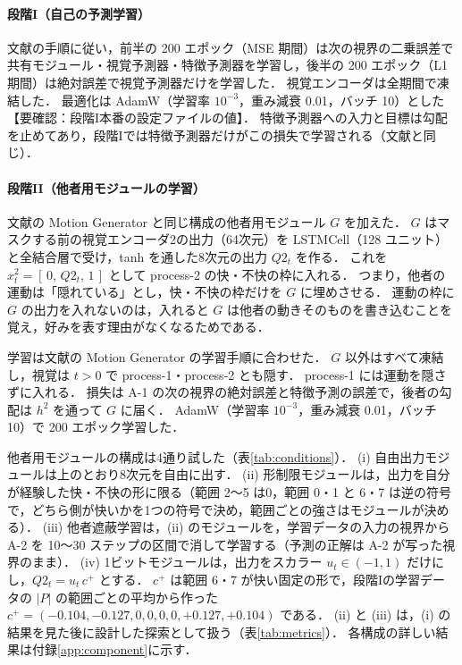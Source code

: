 \paragraph{段階I（自己の予測学習）}
文献\cite{noguchi2022superposition}の手順に従い，前半の 200 エポック（MSE 期間）は次の視界の二乗誤差で共有モジュール・視覚予測器・特徴予測器を学習し，後半の 200 エポック（L1 期間）は絶対誤差で視覚予測器だけを学習した．
視覚エンコーダは全期間で凍結した．
最適化は AdamW（学習率 $10^{-3}$，重み減衰 0.01，バッチ 10）とした【要確認：段階I本番の設定ファイルの値】．
特徴予測器への入力と目標は勾配を止めてあり，段階Iでは特徴予測器だけがこの損失で学習される（文献\cite{noguchi2022superposition}と同じ）．

\paragraph{段階II（他者用モジュールの学習）}
文献\cite{noguchi2022superposition}の Motion Generator と同じ構成の他者用モジュール $G$ を加えた．
$G$ はマスクする前の視覚エンコーダ2の出力（64次元）を LSTMCell（128 ユニット）と全結合層で受け，tanh を通した8次元の出力 $Q2_t$ を作る．
これを $x^2_t = [\,0,\, Q2_t,\, 1\,]$ として process-2 の快・不快の枠に入れる．
つまり，他者の運動は「隠れている」とし，快・不快の枠だけを $G$ に埋めさせる．
運動の枠に $G$ の出力を入れないのは，入れると $G$ は他者の動きそのものを書き込むことを覚え，好みを表す理由がなくなるためである．

学習は文献\cite{noguchi2022superposition}の Motion Generator の学習手順に合わせた．
$G$ 以外はすべて凍結し，視覚は $t>0$ で process-1・process-2 とも隠す．
process-1 には運動を隠さずに入れる．
損失は A-1 の次の視界の絶対誤差と特徴予測の誤差で，後者の勾配は $h^2$ を通って $G$ に届く．
AdamW（学習率 $10^{-3}$，重み減衰 0.01，バッチ 10）で 200 エポック学習した．

他者用モジュールの構成は4通り試した（表\ref{tab:conditions}）．
(i) 自由出力モジュールは上のとおり8次元を自由に出す．
(ii) 形制限モジュールは，出力を自分が経験した快・不快の形に限る（範囲 2〜5 は0，範囲 0・1 と 6・7 は逆の符号で，どちら側が快いかを1つの符号で決め，範囲ごとの強さはモジュールが決める）．
(iii) 他者遮蔽学習は，(ii) のモジュールを，学習データの入力の視界から A-2 を 10〜30 ステップの区間で消して学習する（予測の正解は A-2 が写った視界のまま）．
(iv) 1ビットモジュールは，出力をスカラー $u_t\in(-1,1)$ だけにし，$Q2_t = u_t\, c^{+}$ とする．
$c^{+}$ は範囲 6・7 が快い固定の形で，段階Iの学習データの $|P|$ の範囲ごとの平均から作った $c^{+}=(-0.104,-0.127,0,0,0,0,+0.127,+0.104)$ である．
(ii) と (iii) は，(i) の結果を見た後に設計した探索として扱う（表\ref{tab:metrics}）．
各構成の詳しい結果は付録\ref{app:component}に示す．

